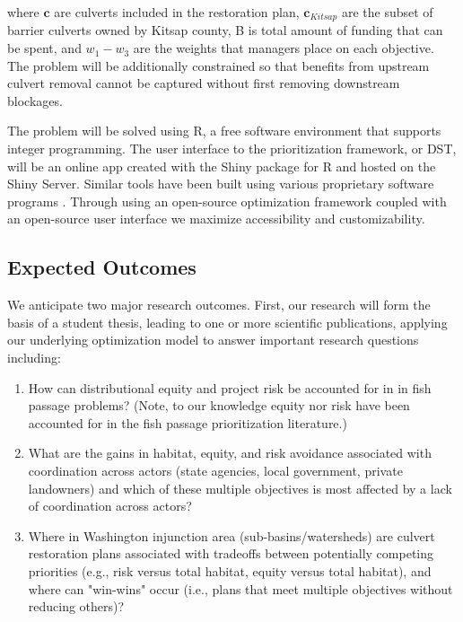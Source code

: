 \documentclass[12pt]{elsarticle}
\begin{document}
	
	where $\boldsymbol{c}$ are culverts included in the restoration plan, $\boldsymbol{c}_{Kitsap}$ are the subset of barrier culverts owned by Kitsap county, B is total amount of funding that can be spent, and $w_1-w_3$ are the weights that managers place on each objective. The problem will be additionally constrained so that benefits from upstream culvert removal cannot be captured without first removing downstream blockages.
	
	The problem will be solved using R, a free software environment that supports integer programming. The user interface to the prioritization framework, or DST, will be an online app created with the Shiny package for R and hosted on the Shiny Server. Similar tools have been built using various proprietary software programs \citep{ohanley_optipass_2015, moody_pet_2017, mcmanamay_commonalities_2019}. Through using an open-source optimization framework coupled with an open-source user interface we maximize accessibility and customizability.  
	
	\subsection{Expected Outcomes} %
	
	We anticipate two major research outcomes. First, our research will form the basis of a student thesis, leading to one or more scientific publications, applying our underlying optimization model to answer important research questions including:
	
	\begin{enumerate}
		\item How can distributional equity and project risk be accounted for in in fish passage problems? (Note, to our knowledge equity nor risk have been accounted for in the fish passage prioritization literature.)
		\item What are the gains in habitat, equity, and risk avoidance associated with coordination across actors (state agencies, local government, private landowners) and which of these multiple objectives is most affected by a lack of coordination across actors?
		\item Where in Washington injunction area (sub-basins/watersheds) are culvert restoration plans associated with tradeoffs between potentially competing priorities (e.g., risk versus total habitat, equity versus total habitat), and where can "win-wins" occur (i.e., plans that meet multiple objectives without reducing others)?
	\end{enumerate}
	
\end{document}
